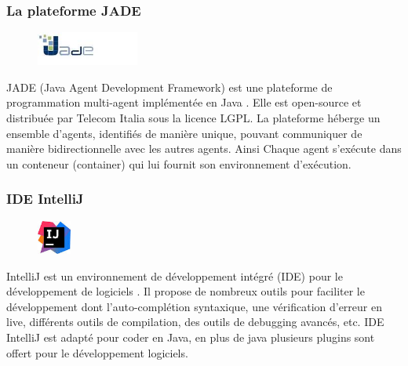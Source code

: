 \subsubsection*{La plateforme JADE}
\begin{figure}
	\vspace{-60pt}
	\begin{center}
		\includegraphics[width=0.3\textwidth]{img/jade}
	\end{center} 
	\vspace{-20pt}
	\vspace{-10pt} 
\end{figure}
JADE (Java Agent Development Framework) est une plateforme de programmation multi-agent implémentée en Java \citep{jade}. Elle est open-source et distribuée par Telecom Italia sous la licence LGPL. La plateforme héberge un ensemble d’agents, identifiés de manière unique, pouvant communiquer de manière bidirectionnelle avec les autres agents. Ainsi Chaque agent s’exécute dans un conteneur (container) qui lui fournit son environnement d’exécution.
\subsubsection*{IDE IntelliJ}
\begin{figure}
	\vspace{-40pt}
	\begin{center}
		\includegraphics[width=0.1\textwidth]{img/ida}
	\end{center} 
	\vspace{-20pt}
	\vspace{-10pt} 
\end{figure}
IntelliJ est un environnement de développement intégré (IDE) pour le développement de logiciels \citep{ida}. Il propose de nombreux outils pour faciliter le développement dont  l'auto-complétion syntaxique, une vérification d'erreur en live, différents outils de compilation, des outils de debugging avancés, etc. IDE IntelliJ est adapté pour coder en Java, en plus de java plusieurs plugins sont offert pour le développement logiciels.

